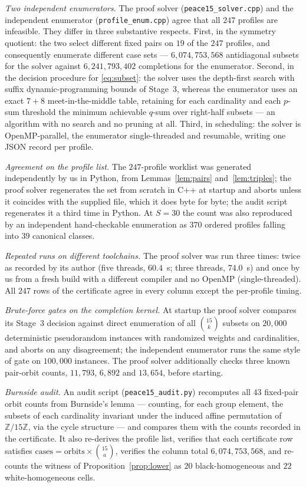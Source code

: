 \documentclass[11pt]{amsart}
\theoremstyle{remark}
\newcommand{\Z}{\mathbb{Z}}
\newcommand{\Zn}{\Z/15\Z}
\begin{document}
\emph{Two independent enumerators.} The proof solver (\texttt{peace15\_solver.cpp}) and the independent enumerator (\texttt{profile\_enum.cpp}) agree that all $247$ profiles are infeasible. They differ in three substantive respects. First, in the symmetry quotient: the two select different fixed pairs on $19$ of the $247$ profiles, and consequently enumerate different case sets --- $6{,}074{,}753{,}568$ antidiagonal subsets for the solver against $6{,}241{,}793{,}402$ completions for the enumerator. Second, in the decision procedure for \eqref{eq:subset}: the solver uses the depth-first search with suffix dynamic-programming bounds of Stage~3, whereas the enumerator uses an exact $7+8$ meet-in-the-middle table, retaining for each cardinality and each $p$-sum threshold the minimum achievable $q$-sum over right-half subsets --- an algorithm with no search and no pruning at all. Third, in scheduling: the solver is OpenMP-parallel, the enumerator single-threaded and resumable, writing one JSON record per profile.

\emph{Agreement on the profile list.} The $247$-profile worklist was generated independently by us in Python, from Lemmas~\ref{lem:pairs} and~\ref{lem:triples}; the proof solver regenerates the set from scratch in C++ at startup and aborts unless it coincides with the supplied file, which it does byte for byte; the audit script regenerates it a third time in Python. At $S=30$ the count was also reproduced by an independent hand-checkable enumeration as $370$ ordered profiles falling into $39$ canonical classes.

\emph{Repeated runs on different toolchains.} The proof solver was run three times: twice as recorded by its author (five threads, $60.4$~s; three threads, $74.0$~s) and once by us from a fresh build with a different compiler and no OpenMP (single-threaded). All $247$ rows of the certificate agree in every column except the per-profile timing.

\emph{Brute-force gates on the completion kernel.} At startup the proof solver compares its Stage~3 decision against direct enumeration of all $\binom{15}{k}$ subsets on $20{,}000$ deterministic pseudorandom instances with randomized weights and cardinalities, and aborts on any disagreement; the independent enumerator runs the same style of gate on $100{,}000$ instances. The proof solver additionally checks three known pair-orbit counts, $11{,}793$, $6{,}892$ and $13{,}654$, before starting.

\emph{Burnside audit.} An audit script (\texttt{peace15\_audit.py}) recomputes all $43$ fixed-pair orbit counts from Burnside's lemma --- counting, for each group element, the subsets of each cardinality invariant under the induced affine permutation of $\Zn$, via the cycle structure --- and compares them with the counts recorded in the certificate. It also re-derives the profile list, verifies that each certificate row satisfies $\text{cases}=\text{orbits}\times\binom{15}{a}$, verifies the column total $6{,}074{,}753{,}568$, and re-counts the witness of Proposition~\ref{prop:lower} as $20$ black-homogeneous and $22$ white-homogeneous cells.
\end{document}
